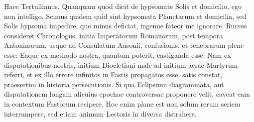 Haec Tertullianus.
Quanquam quod dicit de hypsomate Solis
et domicilio, ego non intelligo.
Scimus quidem quid sint hypsomata
Planetarum et domicilia, sed Solis hypsoma impedire, quo minus
deficiat, ingenue fateor me ignorare.
Rursus consideret Chronologus,
initia Imperatorum Romanorum, post tempora Antoninorum,
usque ad Consulatum Ausonii, confusionis, et tenebrarum plene esse:
Eaque ex methodo nostra, quantum poterit, castiganda esse.
Nam ex disputationibus
nostris, initium Diocletiani male ad initium aerae Martyrum
referri, et ex illo errore infinitos in Fastis propagatos esse, satis
constat, praesertim in historia persecutionis.
Si qua Eclipsium diagrammata,
aut disputationem longam alicuius epochae controversae proponere
velit, caveat eam in contextum Fastorum recipere.
Hoc enim
plane est non solum rerum seriem interrumpere, sed etiam animum
Lectoris in diversa distrahere.


